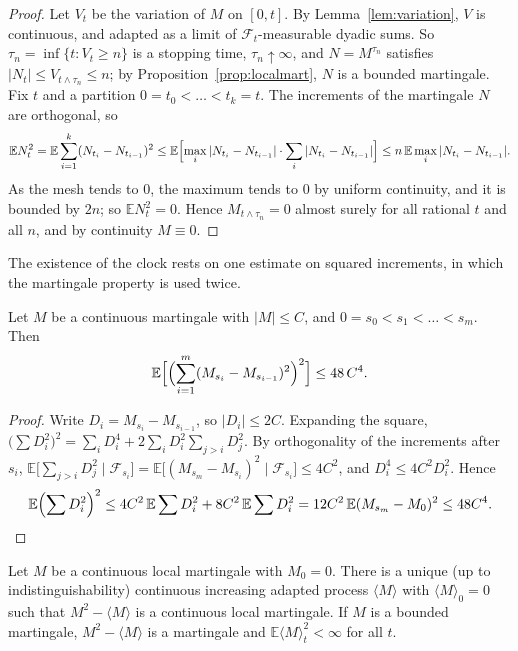 \begin{proof}
Let $V_t$ be the variation of $M$ on $[0,t]$. By Lemma~\ref{lem:variation}, $V$ is continuous, and adapted as a limit of $\mathcal F_t$-measurable dyadic sums. So $\tau_n=\inf\{t:V_t\ge n\}$ is a stopping time,
$\tau_n\uparrow\infty$, and $N=M^{\tau_n}$ satisfies $|N_t|\le V_{t\wedge\tau_n}\le n$; by Proposition~\ref{prop:localmart}, $N$ is a bounded martingale. Fix $t$ and a partition $0=t_0<\dots<t_k=t$. The increments of the
martingale $N$ are orthogonal, so
\[
\mathbb EN_t^2=\mathbb E\sum_{i=1}^k(N_{t_i}-N_{t_{i-1}})^2\le\mathbb E\Bigl[\max_i|N_{t_i}-N_{t_{i-1}}|\cdot\sum_i|N_{t_i}-N_{t_{i-1}}|\Bigr]\le n\,\mathbb E\max_i|N_{t_i}-N_{t_{i-1}}|.
\]
As the mesh tends to $0$, the maximum tends to $0$ by uniform continuity, and it is bounded by $2n$; so $\mathbb EN_t^2=0$. Hence $M_{t\wedge\tau_n}=0$ almost surely for all rational $t$ and all $n$, and by
continuity $M\equiv0$.
\end{proof}

The existence of the clock rests on one estimate on squared increments, in which the martingale property is used twice.

\begin{lemma}\label{lem:fourth}
Let $M$ be a continuous martingale with $|M|\le C$, and $0=s_0<s_1<\dots<s_m$. Then
\[
\mathbb E\Bigl[\Bigl(\sum_{i=1}^m(M_{s_i}-M_{s_{i-1}})^2\Bigr)^2\Bigr]\le48\,C^4.
\]
\end{lemma}

\begin{proof}
Write $D_i=M_{s_i}-M_{s_{i-1}}$, so $|D_i|\le2C$. Expanding the square, $\bigl(\sum D_i^2\bigr)^2=\sum_iD_i^4+2\sum_iD_i^2\sum_{j>i}D_j^2$. By orthogonality of the increments after $s_i$,
$\mathbb E\bigl[\sum_{j>i}D_j^2\mid \mathcal F_{s_i}\bigr]=\mathbb E\bigl[(M_{s_m}-M_{s_i})^2\mid \mathcal F_{s_i}\bigr]\le4C^2$, and $D_i^4\le4C^2D_i^2$. Hence
\[
\mathbb E\Bigl(\sum D_i^2\Bigr)^2\le4C^2\,\mathbb E\sum D_i^2+8C^2\,\mathbb E\sum D_i^2=12C^2\,\mathbb E(M_{s_m}-M_0)^2\le48C^4.
\]
\end{proof}

\begin{theorem}\label{thm:qvexist}
Let $M$ be a continuous local martingale with $M_0=0$. There is a unique (up to indistinguishability) continuous increasing adapted process $\langle M\rangle$ with $\langle M\rangle_0=0$ such that
$M^2-\langle M\rangle$ is a continuous local martingale. If $M$ is a bounded martingale, $M^2-\langle M\rangle$ is a martingale and $\mathbb E\langle M\rangle_t^2<\infty$ for all $t$.
\end{theorem}

